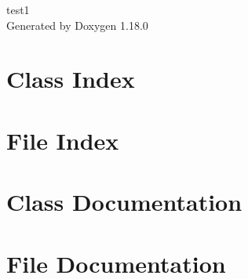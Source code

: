 \documentclass[twoside]{book}
\newcommand{\+}{\discretionary{\mbox{\scriptsize$\hookleftarrow$}}{}{}}
\newcommand{\clearemptydoublepage}{%
    \newpage{\pagestyle{empty}\cleardoublepage}%
  }
\begin{document}
  \raggedbottom
    \hypersetup{pageanchor=false,
                bookmarksnumbered=true,
                pdfencoding=unicode
               }
  \begin{titlepage}
  \vspace*{7cm}
  \begin{center}%
  {\Large test1}\\
  \vspace*{1cm}
  {\large Generated by Doxygen 1.18.0}\\
  \end{center}
  \end{titlepage}
  \clearemptydoublepage
  \tableofcontents
  \clearemptydoublepage
  \hypersetup{pageanchor=true}

\chapter{Class Index}

\chapter{File Index}

\chapter{Class Documentation}



\chapter{File Documentation}



  \backmatter
  \newpage
  \clearemptydoublepage
  \printindex
\end{document}

